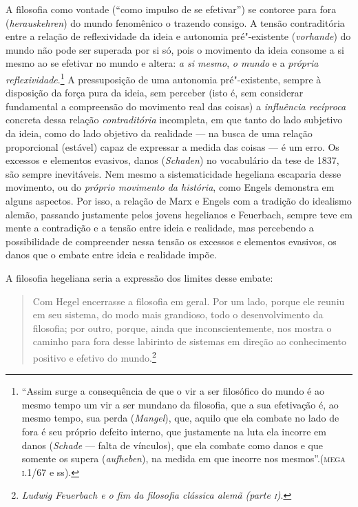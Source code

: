 A filosofia como vontade (``como impulso de se efetivar'') se contorce
para fora (\emph{herauskehren}) do mundo fenomênico o trazendo consigo.
A tensão contraditória entre a relação de reflexividade da ideia e
autonomia pré"-existente (\emph{vorhande}) do mundo não pode ser
superada por si só, pois o movimento da ideia consome a si mesmo ao se
efetivar no mundo e altera: \emph{a si mesmo}, \emph{o mundo} e a
\emph{própria reflexividade}.\footnote{``Assim surge a consequência de
  que o vir a ser filosófico do mundo é ao mesmo tempo um vir a ser
  mundano da filosofia, que a sua efetivação é, ao mesmo tempo, sua
  perda (\emph{Mangel}), que, aquilo que ela combate no lado de fora é
  seu próprio defeito interno, que justamente na luta ela incorre em
  danos (\emph{Schade} --- falta de vínculos), que ela combate como
  danos e que somente os supera (\emph{aufheben}), na medida em que
  incorre nos mesmos''.(\textsc{mega} \textsc{i}.1/67 e ss).} A
pressuposição de uma autonomia pré"-existente, sempre à disposição da
força pura da ideia, sem perceber (isto é, sem considerar fundamental a
compreensão do movimento real das coisas) a \emph{influência recíproca}
concreta dessa relação \emph{contraditória} incompleta, em que tanto do
lado subjetivo da ideia, como do lado objetivo da realidade --- na busca
de uma relação proporcional (estável) capaz de expressar a medida das
coisas --- é um erro. Os excessos e elementos evasivos, danos
(\emph{Schaden}) no vocabulário da tese de 1837, são sempre inevitáveis.
Nem mesmo a sistematicidade hegeliana escaparia desse movimento, ou do
\emph{próprio movimento da história}, como Engels demonstra em alguns
aspectos. Por isso, a relação de Marx e Engels com a tradição do
idealismo alemão, passando justamente pelos jovens hegelianos e
Feuerbach, sempre teve em mente a contradição e a tensão entre ideia e
realidade, mas percebendo a possibilidade de compreender nessa tensão os
excessos e elementos evasivos, os danos que o embate entre ideia e
realidade impõe.

A filosofia hegeliana seria a expressão dos limites desse embate:

\begin{quote}
Com Hegel encerrasse a filosofia em geral. Por um lado, porque ele
reuniu em seu sistema, do modo mais grandioso, todo o desenvolvimento da
filosofia; por outro, porque, ainda que inconscientemente, nos mostra o
caminho para fora desse labirinto de sistemas em direção ao conhecimento
positivo e efetivo do mundo.\footnote{\emph{Ludwig Feuerbach e o fim
  da filosofia clássica alemã (parte \textsc{i})}.}
\end{quote}

